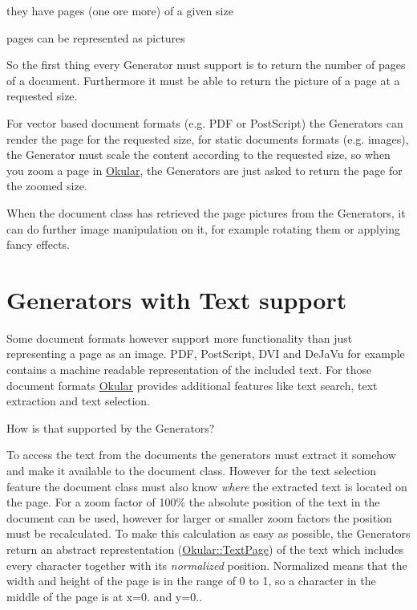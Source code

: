 \begin{DoxyItemize}
\item they have pages (one ore more) of a given size \item pages can be represented as pictures\end{DoxyItemize}
So the first thing every Generator must support is to return the number of pages of a document. Furthermore it must be able to return the picture of a page at a requested size.

For vector based document formats (e.\+g. P\+D\+F or Post\+Script) the Generators can render the page for the requested size, for static documents formats (e.\+g. images), the Generator must scale the content according to the requested size, so when you zoom a page in \hyperlink{namespaceOkular}{Okular}, the Generators are just asked to return the page for the zoomed size.

When the document class has retrieved the page pictures from the Generators, it can do further image manipulation on it, for example rotating them or applying fancy effects.\hypertarget{okular_design_okular_design_text_support}{}\section{Generators with Text support}\label{okular_design_okular_design_text_support}
Some document formats however support more functionality than just representing a page as an image. P\+D\+F, Post\+Script, D\+V\+I and De\+Ja\+Vu for example contains a machine readable representation of the included text. For those document formats \hyperlink{namespaceOkular}{Okular} provides additional features like text search, text extraction and text selection.

How is that supported by the Generators?

To access the text from the documents the generators must extract it somehow and make it available to the document class. However for the text selection feature the document class must also know {\itshape where} the extracted text is located on the page. For a zoom factor of 100\% the absolute position of the text in the document can be used, however for larger or smaller zoom factors the position must be recalculated. To make this calculation as easy as possible, the Generators return an abstract represtentation (\hyperlink{classOkular_1_1TextPage}{Okular\+::\+Text\+Page}) of the text which includes every character together with its {\itshape normalized} position. Normalized means that the width and height of the page is in the range of 0 to 1, so a character in the middle of the page is at x=0. and y=0..

